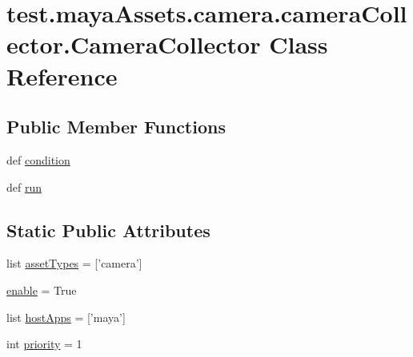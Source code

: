 \hypertarget{classtest_1_1mayaAssets_1_1camera_1_1cameraCollector_1_1CameraCollector}{\section{test.\-maya\-Assets.\-camera.\-camera\-Collector.\-Camera\-Collector \-Class \-Reference}
\label{d0/d78/classtest_1_1mayaAssets_1_1camera_1_1cameraCollector_1_1CameraCollector}
}
\subsection*{\-Public \-Member \-Functions}
\begin{DoxyCompactItemize}
\item 
def \hyperlink{classtest_1_1mayaAssets_1_1camera_1_1cameraCollector_1_1CameraCollector_a1c9e73906d47b661ce1ba49ffd0d18be}{condition}
\item 
def \hyperlink{classtest_1_1mayaAssets_1_1camera_1_1cameraCollector_1_1CameraCollector_a33a8aff3a0ff3fe906d2deef1188e895}{run}
\end{DoxyCompactItemize}
\subsection*{\-Static \-Public \-Attributes}
\begin{DoxyCompactItemize}
\item 
list \hyperlink{classtest_1_1mayaAssets_1_1camera_1_1cameraCollector_1_1CameraCollector_a1842bf01cf7f10d0902a89830b34ad19}{asset\-Types} = \mbox{[}'camera'\mbox{]}
\item 
\hyperlink{classtest_1_1mayaAssets_1_1camera_1_1cameraCollector_1_1CameraCollector_af0576ce17748f2d01bf8ba9f1e3d5972}{enable} = \-True
\item 
list \hyperlink{classtest_1_1mayaAssets_1_1camera_1_1cameraCollector_1_1CameraCollector_abf43893f7c44cb7b5e188b05fd149f00}{host\-Apps} = \mbox{[}'maya'\mbox{]}
\item 
int \hyperlink{classtest_1_1mayaAssets_1_1camera_1_1cameraCollector_1_1CameraCollector_abb8a3f44fb1a6978f04dfe35849aba9f}{priority} = 1
\end{DoxyCompactItemize}


